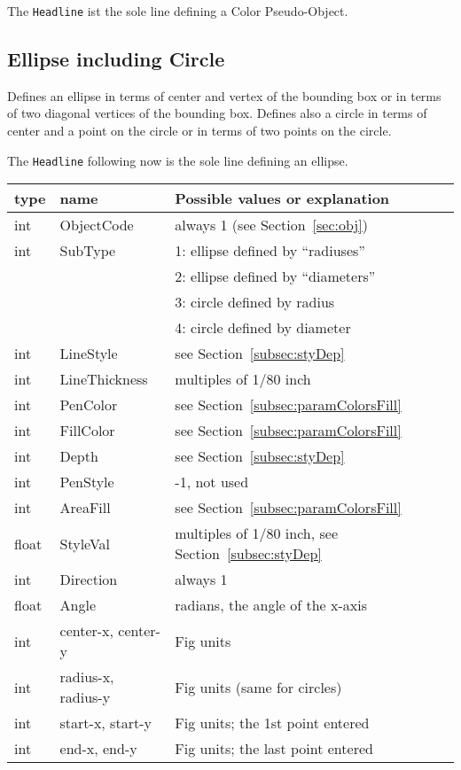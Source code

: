 \documentclass[10pt, a4paper]{article}
\begin{document}
The \texttt{Headline} ist the sole line defining a Color Pseudo-Object. 


\subsection{Ellipse including Circle}\label{subsec:ellipse}

Defines an ellipse in terms of center and vertex of the bounding box 
or in terms of two diagonal vertices of the bounding box. 
Defines also a circle in terms of center and a point on the circle 
or in terms of two points on the circle. 

\noindent
The \texttt{Headline} following now is the sole line defining an ellipse. \\
%
\begin{tabular}{lll}
\toprule
type  & name                & Possible values or explanation \\
\midrule
\midrule
int   &  ObjectCode         & always 1 (see Section~\ref{sec:obj}) \\
int   &  SubType            & 1: ellipse defined by ``radiuses'' \\
&&                            2: ellipse defined by ``diameters'' \\
&&                            3: circle defined by radius \\
&&                            4: circle defined by diameter \\
int   &  LineStyle          & see Section~\ref{subsec:styDep} \\
int   &  LineThickness      & multiples of 1/80 inch \\
int   &  PenColor           & see Section~\ref{subsec:paramColorsFill} \\
int   &  FillColor          & see Section~\ref{subsec:paramColorsFill} \\
int   &  Depth              & see Section~\ref{subsec:styDep} \\
int   &  PenStyle           & -1, not used \\
int   &  AreaFill           & see Section~\ref{subsec:paramColorsFill} \\
float &  StyleVal           & multiples of 1/80 inch, 
                              see Section~\ref{subsec:styDep}  \\
int   &  Direction          & always 1 \\
float &  Angle              & radians, the angle of the x-axis \\
int   &  center-x, center-y & Fig units \\
int   &  radius-x, radius-y & Fig units (same for circles) \\
int   &  start-x, start-y   & Fig units; the 1st point entered \\
int   &  end-x, end-y       & Fig units; the last point entered \\
\bottomrule
\end{tabular}
\end{document}
